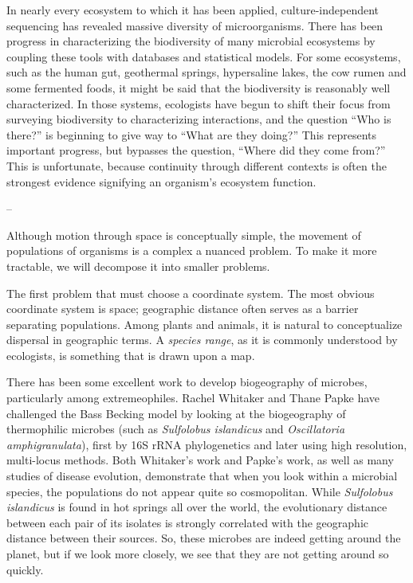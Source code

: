 In nearly every ecosystem to which it has been applied, culture-independent sequencing has revealed massive diversity of microorganisms. There has been progress in characterizing the biodiversity of many microbial ecosystems by coupling these tools with databases and statistical models. For some ecosystems, such as the human gut, geothermal springs, hypersaline lakes, the cow rumen and some fermented foods, it might be said that the biodiversity is reasonably well characterized. In those systems, ecologists have begun to shift their focus from surveying biodiversity to characterizing interactions, and the question ``Who is there?'' is beginning to give way to ``What are they doing?'' This represents important progress, but bypasses the question, ``Where did they come from?'' This is unfortunate, because continuity through different contexts is often the strongest evidence signifying an organism's ecosystem function.

--

Although motion through space is conceptually simple, the movement of populations of organisms is a complex a nuanced problem. To make it more tractable, we will decompose it into smaller problems. 

The first problem that must choose a coordinate system. The most obvious coordinate system is space; geographic distance often serves as a barrier separating populations. Among plants and animals, it is natural to conceptualize dispersal in geographic terms. A {\em species range}, as it is commonly understood by ecologists, is something that is drawn upon a map. 

There has been some excellent work to develop biogeography of microbes, particularly among extremeophiles. Rachel Whitaker and Thane Papke have challenged the Bass Becking model by looking at the biogeography of thermophilic microbes (such as {\em Sulfolobus islandicus} and {\em Oscillatoria amphigranulata}), first by 16S rRNA phylogenetics and later using high resolution, multi-locus methods. Both Whitaker's work and Papke's work, as well as many studies of disease evolution, demonstrate that when you look within a microbial species, the populations do not appear quite so cosmopolitan. While {\em Sulfolobus islandicus} is found in hot springs all over the world, the evolutionary distance between each pair of its isolates is strongly correlated with the geographic distance between their sources. So, these microbes are indeed getting around the planet, but if we look more closely, we see that they are not getting around so quickly. 

